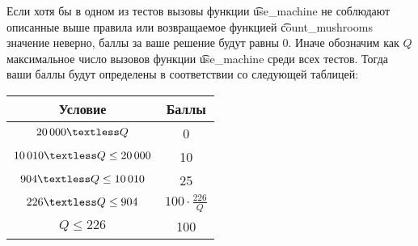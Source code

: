 \newcommand{\lt}{\textless} 


Если хотя бы в одном из тестов вызовы функции \t{use\_machine} не соблюдают описанные выше правила или возвращаемое функцией \t{count\_mushrooms} значение неверно, баллы за ваше решение будут равны $0$.
Иначе обозначим как $Q$ максимальное число вызовов функции \t{use\_machine} среди всех тестов.
Тогда ваши баллы будут определены в соответствии со следующей таблицей:

\begin{center}
\renewcommand{\arraystretch}{1.5}
\begin{tabular}{|c|c|}
\hline
Условие & Баллы  \\
\hline
$20\,000 \lt Q$ & 0 \\
\hline

$10\,010 \lt Q \le 20\,000$ & 10 \\
\hline

$904 \lt Q \le 10\,010$ & 25 \\
\hline

$226 \lt Q \le 904$ & $100 \cdot \frac{226}{Q}$ \\
\hline

$Q \le 226$ & 100 \\
\hline

\end{tabular}
\end{center}


